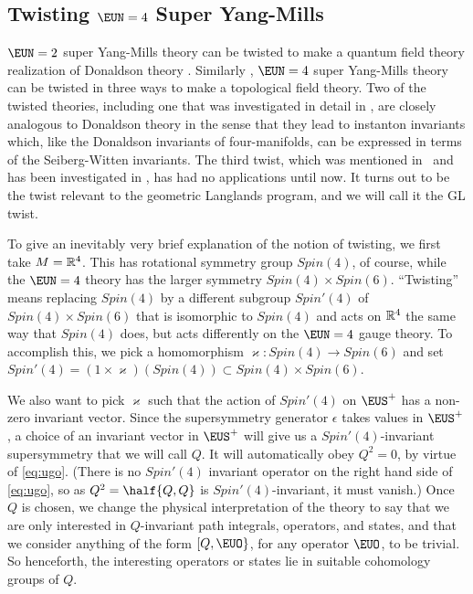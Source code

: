 
\subsection{Twisting ${\EUN}=4$ Super Yang-Mills}

\label{sec:twisting}

\par{}

  

 ${\EUN}=2$ super Yang-Mills theory can be twisted to make a
quantum field theory realization of Donaldson theory \cite{ref25}.
Similarly \cite{ref45}, ${\EUN}=4$ super Yang-Mills theory can be
twisted in three ways to make a topological field theory.  Two of
the twisted theories, including one that was investigated in
detail in \cite{ref45}, are closely analogous to Donaldson theory
in the sense that they lead to instanton invariants which, like
the Donaldson invariants of four-manifolds, can be expressed in
terms of the Seiberg-Witten invariants.   The third twist, which
was mentioned in \cite{ref52}\ and has been investigated in
\cite{ref53,ref54,ref55,ref56,ref57}, has had no applications until now. It
turns out to be the twist relevant to the geometric Langlands
program, and we will call it the GL twist.

To give an inevitably very brief explanation of the notion of
twisting, we first take $M=\Bbb{R}^4$. This has rotational
symmetry group $Spin(4)$, of course, while the ${\EUN}=4$ theory
has the larger symmetry $Spin(4)\times Spin(6)$.
 ``Twisting'' means replacing
$Spin(4)$ by a different subgroup $Spin'(4)$ of $Spin(4)\times
Spin(6)$ that is isomorphic to $Spin(4)$ and acts on $\Bbb{R}^4$
the same way that $ Spin(4)$ does, but acts differently on the
${\EUN}=4$ gauge theory. To accomplish this, we pick a
homomorphism $\varkappa:Spin(4)\to Spin(6)$ and set
$Spin'(4)=(1\times \varkappa)(Spin(4))\subset Spin(4)\times
Spin(6)$.

We also want to pick $\varkappa $ such that the action of
$Spin'(4)$ on ${\EUS}^+$ has a non-zero invariant vector.  Since
the supersymmetry generator $\epsilon$ takes values in  $
{\EUS}^+$, a choice of  an invariant vector in ${\EUS}^+$ will
give us a $Spin'(4)$-invariant supersymmetry that we will call
$Q$.  It will automatically obey $Q^2=0$, by virtue of \eqref{eq:ugo}.
(There is no $Spin'(4)$ invariant operator on the right hand side
of \eqref{eq:ugo}, so as $Q^2=\half\{Q,Q\}$ is $Spin'(4)$-invariant, it must
vanish.) Once $Q$ is chosen, we change the physical interpretation
of the theory to say that we are only interested in $Q$-invariant
path integrals, operators, and states, and that we consider
anything of the form $[Q,{\EUO}\}$, for any operator ${\EUO}$, to
be trivial. So henceforth, the interesting operators or states lie
in suitable cohomology groups of $Q$.

